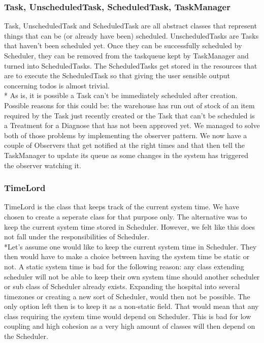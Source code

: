 \documentclass[11pt]{article}
\begin{document}
\subsubsection{Task, UnscheduledTask, ScheduledTask, TaskManager}
Task, UnscheduledTask and ScheduledTask are all abstract classes that represent things that can be (or already have been) scheduled. UnscheduledTasks are Tasks that haven't been scheduled yet. Once they can be successfully scheduled by Scheduler, they can be removed from the taskqueue kept by TaskManager and turned into ScheduledTasks. The ScheduledTasks get stored in the resources that are to execute the ScheduledTask so that giving the user sensible output concerning todos is almost trivial.
\\* As is, it is possible a Task can't be immediately scheduled after creation. Possible reasons for this could be: the warehouse has run out of stock of an item required by the Task just recently created or the Task that can't be scheduled is a Treatment for a Diagnose that has not been approved yet. We managed to solve both of those problems by implementing the observer pattern. We now have a couple of Observers that get notified at the right times and that then tell the TaskManager to update its queue as some changes in the system has triggered the observer watching it.

\subsubsection{TimeLord}
TimeLord is the class that keeps track of the current system time. We have chosen to create a seperate class for that purpose only. The alternative was to keep the current system time stored in Scheduler. However, we felt like this does not fall under the responsibilities of Scheduler. 
\\*Let's assume one would like to keep the current system time in Scheduler. They then would have to make a choice between having the system time be static or not. A static system time is bad for the following reason: any class extending scheduler will not be able to keep their own system time should another scheduler or sub class of Scheduler already exists. Expanding the hospital into several timezones or creating a new sort of Scheduler, would then not be possible. The only option left then is to keep it as a non-static field. That would mean that any class requiring the system time would depend on Scheduler. This is bad for low coupling and high cohesion as a very high amount of classes will then depend on the Scheduler.
\end{document}
